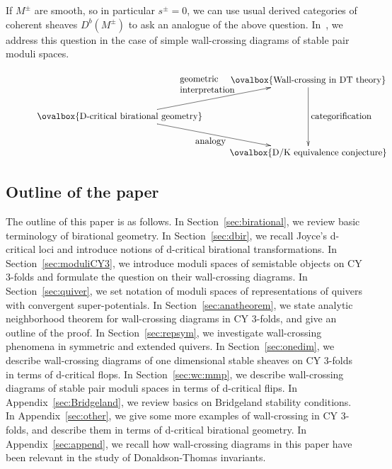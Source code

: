 \documentclass[11pt]{amsart}
\theoremstyle{plain}
\theoremstyle{definition}
\theoremstyle{remark}
\begin{document}
If $M^{\pm}$ are smooth, 
so in particular $s^{\pm}=0$, we can use 
usual derived categories of coherent sheaves $D^b(M^{\pm})$
to ask 
an analogue of the above question. 
In~\cite{TodDK}, we address this question in the case of 
simple wall-crossing diagrams 
of stable pair moduli spaces. 


\begin{figure}\label{fig:intro}
\begin{align*}
\xymatrix{
&  \ovalbox{\mbox{Wall-crossing in DT theory}}  
\ar[dd]^-{\mbox{categorification}} \\
\ovalbox{\mbox{D-critical birational geometry}} 
\ar[ru]^-{\begin{array}{ll}\mbox{geometric} \\
\mbox{interpretation}
\end{array}} \ar[rd]_-{\mbox{analogy}} &  \\
& \ovalbox{\mbox{D/K equivalence conjecture}}
}
\end{align*}
\end{figure}




\subsection{Outline of the paper}
The outline of this paper is as follows. 
In Section~\ref{sec:birational}, we
review basic terminology of 
birational geometry. 
In Section~\ref{sec:dbir}, we recall 
Joyce's d-critical loci
and introduce notions of d-critical 
birational transformations. 
In Section~\ref{sec:moduliCY3}, 
we introduce moduli spaces of 
semistable objects on CY 3-folds 
and formulate the 
question on their wall-crossing diagrams. 
In Section~\ref{sec:quiver}, we set 
notation of moduli spaces of representations 
of quivers with convergent super-potentials. 
In Section~\ref{sec:anatheorem}, we state
analytic neighborhood theorem 
for wall-crossing diagrams in CY 3-folds, and 
give an outline of the proof. 
In Section~\ref{sec:repsym}, we investigate 
wall-crossing phenomena in symmetric 
and extended quivers. 
In Section~\ref{sec:onedim}, we describe 
wall-crossing diagrams of one dimensional stable 
sheaves on CY 3-folds in terms of d-critical flops. 
In Section~\ref{sec:wc:mmp}, we describe 
wall-crossing diagrams of stable pair 
moduli spaces in terms of d-critical flips. 
In Appendix~\ref{sec:Bridgeland}, we review basics on 
Bridgeland stability conditions. 
In Appendix~\ref{sec:other}, we give 
some more examples of wall-crossing in CY 3-folds, 
and describe them in terms of
d-critical birational geometry. 
In Appendix~\ref{sec:append}, we recall how wall-crossing 
diagrams in this paper have been relevant in 
the study of Donaldson-Thomas invariants. 
\end{document}
